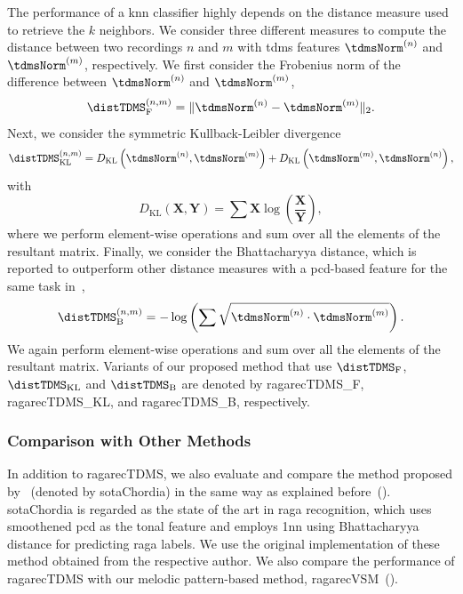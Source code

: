 The performance of a \gls{knn} classifier highly depends on the distance measure used to retrieve the $k$ neighbors. We consider three different measures to compute the distance between two recordings $n$ and $m$ with \gls{tdms} features $\tdmsNorm^{(n)}$ and $\tdmsNorm^{(m)}$, respectively. We first consider the Frobenius norm of the difference between $\tdmsNorm^{(n)}$ and $\tdmsNorm^{(m)}$,
\begin{equation}
\distTDMS_{\mathrm{F}}^{(n,m)} = \norm{\tdmsNorm^{(n)} - \tdmsNorm^{(m)}}_2 .
\end{equation}
Next, we consider the symmetric Kullback-Leibler divergence
\begin{equation}
\distTDMS_{\mathrm{KL}}^{(n,m)} = D_{\mathrm{KL}}\left(\tdmsNorm^{(n)},\tdmsNorm^{(m)}\right) + D_{\mathrm{KL}}\left(\tdmsNorm^{(m)},\tdmsNorm^{(n)}\right) ,
\end{equation}
with
\begin{equation}
D_{\mathrm{KL}}\left(\mathbf{X},\mathbf{Y}\right) = \sum{\mathbf{X} \log\left(\frac{\mathbf{X}}{\mathbf{Y}} \right)} ,
\end{equation}
where we perform element-wise operations and sum over all the elements of the resultant matrix. Finally, we consider the Bhattacharyya distance, which is reported to outperform other distance measures with a \gls{pcd}-based feature for the same task in~\cite{chordia2013joint},
\begin{equation}
\distTDMS_{\mathrm{B}}^{(n,m)} = -\log\left( \sum{ \sqrt{ \tdmsNorm^{(n)} \cdot \tdmsNorm^{(m)} } } \right) .
\end{equation}
We again perform element-wise operations and sum over all the elements of the resultant matrix. Variants of our proposed method that use $\distTDMS_{\mathrm{F}}$, $\distTDMS_{\mathrm{KL}}$ and $\distTDMS_{\mathrm{B}}$ are denoted by \acrshort{ragarecTDMS_F}, \acrshort{ragarecTDMS_KL}, and \acrshort{ragarecTDMS_B}, respectively.


\subsubsection{Comparison with Other Methods}
\label{sec:tdms_comparison_other}

In addition to \acrshort{ragarecTDMS}, we also evaluate and compare the method proposed by~\cite{chordia2013joint} (denoted by \acrshort{sotaChordia}) in the same way as explained before~(). \acrshort{sotaChordia} is regarded as the state of the art in \gls{raga} recognition, which uses smoothened \acrfull{pcd} as the tonal feature and employs \acrfull{1nn} using Bhattacharyya distance for predicting \gls{raga} labels. We use the original implementation of these method obtained from the respective author. We also compare the performance of \acrshort{ragarecTDMS} with our melodic pattern-based method, \acrshort{ragarecVSM}~().


